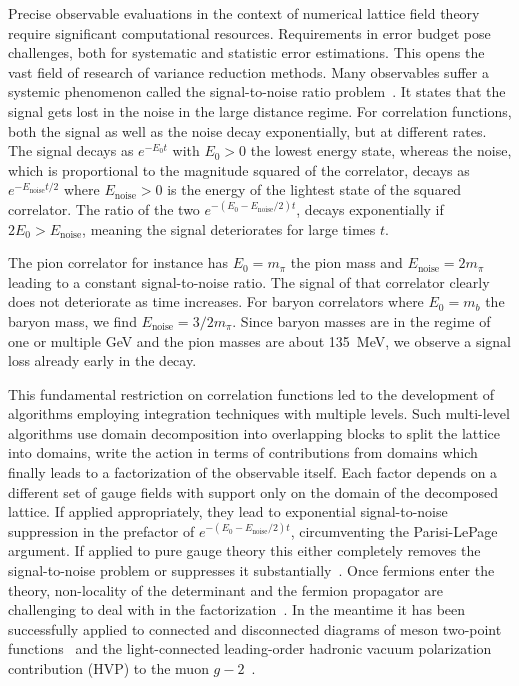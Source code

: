 Precise observable evaluations in the context of numerical lattice field theory require significant computational resources.
Requirements in error budget pose challenges, both for systematic and statistic error estimations.
This opens the vast field of research of variance reduction methods.
Many observables suffer a systemic phenomenon called the signal-to-noise ratio problem~\cite{parisi1984,lepage1989}.
It states that the signal gets lost in the noise in the large distance regime.
For correlation functions, both the signal as well as the noise decay exponentially, but at different rates.
The signal decays as $e^{-E_0 t}$ with $E_0 > 0$ the lowest energy state, whereas the noise, which is proportional to the magnitude squared of the correlator, decays as $e^{-E_{\text{noise}}t/2}$ where $E_{\text{noise}} > 0$ is the energy of the lightest state of the squared correlator.
The ratio of the two $e^{-(E_0 - E_{\text{noise}}/2)t}$, decays exponentially if $2E_0 > E_{\text{noise}}$, meaning the signal deteriorates for large times $t$.

The pion correlator for instance has $E_0 = m_{\pi}$ the pion mass and $E_{\text{noise}} = 2 m_{\pi}$ leading to a constant signal-to-noise ratio.
The signal of that correlator clearly does not deteriorate as time increases.
For baryon correlators where $E_0 = m_{b}$ the baryon mass, we find $E_{\text{noise}} = 3/2 m_{\pi}$.
Since baryon masses are in the regime of one or multiple GeV and the pion masses are about \SI{135}{\mega \eV}, we observe a signal loss already early in the decay.

This fundamental restriction on correlation functions led to the development of algorithms employing integration techniques with multiple levels.
Such multi-level algorithms use domain decomposition into overlapping blocks to split the lattice into domains, write the action in terms of contributions from domains which finally leads to a factorization of the observable itself.
Each factor depends on a different set of gauge fields with support only on the domain of the decomposed lattice.
If applied appropriately, they lead to exponential signal-to-noise suppression in the prefactor of $e^{-(E_0 - E_{\text{noise}}/2)t}$, circumventing the Parisi-LePage argument.
If applied to pure gauge theory this either completely removes the signal-to-noise problem or suppresses it substantially~\cite{Luscher:2001up,Meyer:2002cd,DellaMorte:2007zz,DellaMorte:2008jd,della2011novel}.
Once fermions enter the theory, non-locality of the determinant and the fermion propagator are challenging to deal with in the factorization~\cite{Ce:2016idq,Ce:2016ajy,Giusti:2017ksp,Ce:2017ndt}.
In the meantime it has been successfully applied to connected and disconnected diagrams of meson two-point functions~\cite{Giusti:2018vxm} and the light-connected leading-order hadronic vacuum polarization contribution (HVP) to the muon $g-2$~\cite{DallaBrida:2020cik,Giusti:2021qhk}.

